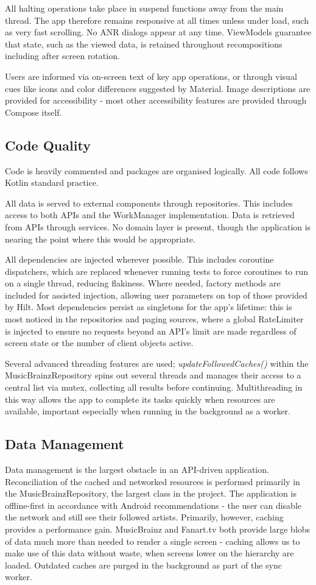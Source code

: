 \documentclass[]{article}
\begin{document}
All halting operations take place in suspend functions away from the main thread. The app therefore remains responsive at all times unless under load, such as very fast scrolling. No ANR dialogs appear at any time. ViewModels guarantee that state, such as the viewed data, is retained throughout recompositions including after screen rotation.

Users are informed via on-screen text of key app operations, or through visual cues like icons and color differences suggested by Material. Image descriptions are provided for accessibility - most other accessibility features are provided through Compose itself.

\subsection{Code Quality}
Code is heavily commented and packages are organised logically. All code follows Kotlin standard practice.

All data is served to external components through repositories. This includes access to both APIs and the WorkManager implementation. Data is retrieved from APIs through services. No domain layer is present, though the application is nearing the point where this would be appropriate.

All dependencies are injected wherever possible. This includes coroutine dispatchers, which are replaced whenever running tests to force coroutines to run on a single thread, reducing flakiness. Where needed, factory methods are included for assisted injection, allowing user parameters on top of those provided by Hilt. Most dependencies persist as singletons for the app's lifetime: this is most noticed in the repositories and paging sources, where a global RateLimiter is injected to ensure no requests beyond an API's limit are made regardless of screen state or the number of client objects active. 

Several advanced threading features are used; \textit{updateFollowedCaches()} within the MusicBrainzRepository spins out several threads and manages their access to a central list via mutex, collecting all results before continuing. Multithreading in this way allows the app to complete its tasks quickly when resources are available, important especially when running in the background as a worker.

\subsection{Data Management}
Data management is the largest obstacle in an API-driven application. Reconciliation of the cached and networked resources is performed primarily in the MusicBrainzRepository, the largest class in the project. The application is offline-first in accordance with Android recommendations - the user can disable the network and still see their followed artists. Primarily, however, caching provides a performance gain. MusicBrainz and Fanart.tv both provide large blobs of data much more than needed to render a single screen - caching allows us to make use of this data without waste, when screens lower on the hierarchy are loaded. Outdated caches are purged in the background as part of the sync worker.
\end{document}
